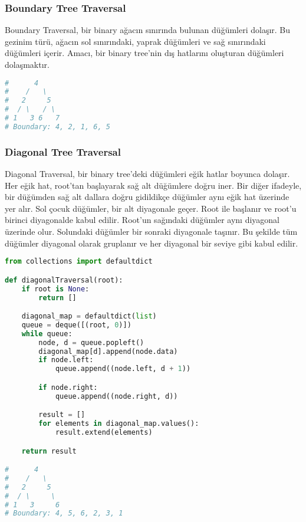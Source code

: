 \newpage

\subsubsection{Boundary Tree Traversal}

Boundary Traversal, bir binary ağacın sınırında bulunan düğümleri dolaşır. Bu gezinim türü, ağacın sol sınırındaki, yaprak düğümleri ve sağ sınırındaki düğümleri içerir. Amacı, bir binary tree'nin dış hatlarını oluşturan düğümleri dolaşmaktır. 

\begin{lstlisting}[language=Python]
#      4
#    /   \
#   2     5
#  / \   / \
# 1   3 6   7
# Boundary: 4, 2, 1, 6, 5
\end{lstlisting}

\newpage

\subsubsection{Diagonal Tree Traversal}

Diagonal Traversal, bir binary tree'deki düğümleri eğik hatlar boyunca dolaşır. Her eğik hat, root’tan başlayarak sağ alt düğümlere doğru iner. Bir diğer ifadeyle, bir düğümden sağ alt dallara doğru gidildikçe düğümler aynı eğik hat üzerinde yer alır. Sol çocuk düğümler, bir alt diyagonale geçer. Root ile başlanır ve root'u birinci diyagonalde kabul edilir. Root'un sağındaki düğümler aynı diyagonal üzerinde olur. Solundaki düğümler bir sonraki diyagonale taşınır. Bu şekilde tüm düğümler diyagonal olarak gruplanır ve her diyagonal bir seviye gibi kabul edilir.

\begin{lstlisting}[language=Python]
from collections import defaultdict

def diagonalTraversal(root):
    if root is None:
        return []

    diagonal_map = defaultdict(list)
    queue = deque([(root, 0)])
    while queue:
        node, d = queue.popleft()
        diagonal_map[d].append(node.data)
        if node.left:
            queue.append((node.left, d + 1))

        if node.right:
            queue.append((node.right, d))

        result = []
        for elements in diagonal_map.values():
            result.extend(elements)

    return result

#      4
#    /   \
#   2     5
#  / \     \
# 1   3     6
# Boundary: 4, 5, 6, 2, 3, 1
\end{lstlisting}

